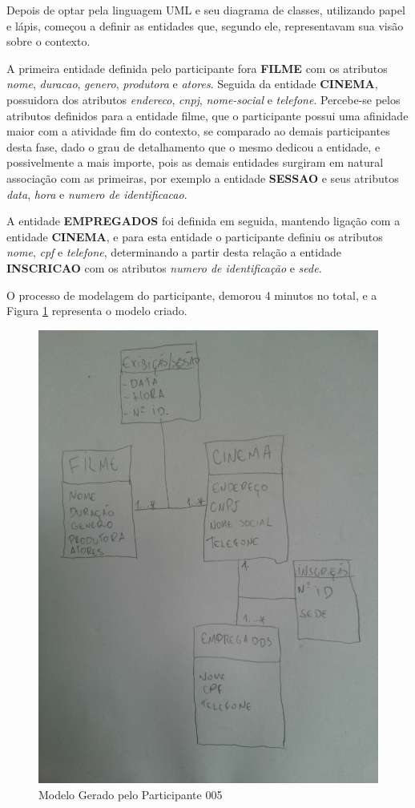 Depois de optar pela linguagem UML e seu diagrama de classes, utilizando papel e lápis, começou a definir as entidades que, segundo ele, representavam sua visão sobre o contexto.

A primeira entidade definida pelo participante fora \textbf{FILME} com os atributos \textit{nome}, \textit{duracao}, \textit{genero}, \textit{produtora} e \textit{atores}. Seguida da entidade \textbf{CINEMA}, possuidora dos atributos \textit{endereco}, \textit{cnpj}, \textit{nome-social} e \textit{telefone}. Percebe-se pelos atributos definidos para a entidade filme, que o participante possui uma afinidade maior com a atividade fim do contexto, se comparado ao demais participantes desta fase, dado o grau de detalhamento que o mesmo dedicou a entidade, e possivelmente a mais importe, pois as demais entidades surgiram em natural associação com as primeiras, por exemplo a entidade \textbf{SESSAO} e seus atributos \textit{data}, \textit{hora} e \textit{numero de identificacao}. 

A entidade \textbf{EMPREGADOS} foi definida em seguida, mantendo ligação com a entidade \textbf{CINEMA}, e para esta entidade o participante definiu os atributos \textit{nome}, \textit{cpf} e \textit{telefone}, determinando a partir desta relação a entidade \textbf{INSCRICAO} com os atributos \textit{numero de identificação} e \textit{sede}.

O processo de modelagem do participante, demorou 4 minutos no total, e a Figura \ref{fig:Modelo_000_modesto} representa o modelo criado.

\begin{figure}[!ht]
    \centering
    \includegraphics[width=\textwidth, height=\textwidth,angle=270]{imagens/Modelo_000_Modesto.jpg}
    \caption{Modelo Gerado pelo Participante 005}
    \label{fig:Modelo_000_modesto}
\end{figure}

